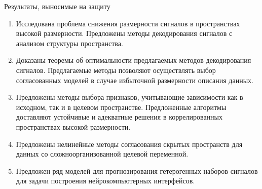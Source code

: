 \documentclass[10pt]{beamer}
\begin{document}
\begin{frame}{Результаты, выносимые на защиту}
\begin{enumerate}
	\item Исследована проблема снижения размерности сигналов в пространствах высокой размерности. Предложены методы декодирования сигналов с анализом структуры пространства.
	\vfill
	\item Доказаны теоремы об оптимальности предлагаемых методов декодирования сигналов. Предлагаемые методы позволяют осуществлять выбор согласованных моделей в случае избыточной размерности описания данных.
	\vfill 
	\item Предложены методы выбора признаков, учитывающие зависимости как в исходном, так и в целевом пространстве. Предложенные алгоритмы доставляют устойчивые и адекватные решения в коррелированных пространствах высокой размерности.
	\vfill
	\item Предложены нелинейные методы согласования скрытых пространств для данных со сложноорганизованной целевой переменной.
	\vfill
	\item Предложен ряд моделей для прогнозирования гетерогенных наборов сигналов для задачи построения нейрокомпьютерных интерфейсов.
\end{enumerate}
\end{frame}
\end{document}
